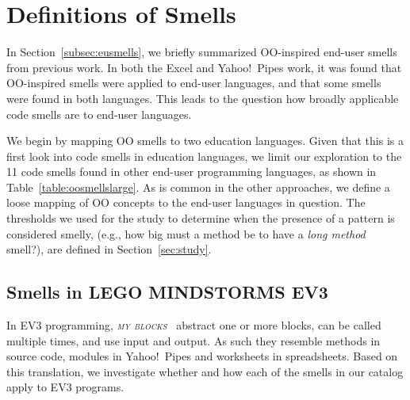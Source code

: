 \documentclass[conference]{IEEEtran}
\newcommand{\ms}{LEGO MINDSTORMS EV3}
\newcommand{\mbs}{\textsc{my blocks}}
\newcommand{\todo}[1]{\textbf{#1}}
\begin{document}


\section{Definitions of Smells}
\label{sec:definition}
In Section~\ref{subsec:eusmells}, we briefly summarized OO-inspired end-user smells from previous work. In both the Excel and Yahoo!\ Pipes work, it was found that OO-inspired smells were applied to end-user languages, and that some smells were found in both languages. This leads to the question how broadly applicable code smells are to end-user languages. 

We begin by mapping OO smells to two education languages. Given that this is a first look into code smells in education languages, we limit our exploration to the 11 code smells found in other end-user programming languages, as shown in Table~\ref{table:oosmellslarge}.
As is common in the other approaches, we define a loose mapping of OO concepts to the end-user languages in question.
The thresholds we used for the study to determine when the presence of a pattern is considered smelly, (e.g., how big must a method be to have a \emph{long method} smell?),  are defined in Section~\ref{sec:study}. 



\subsection{Smells in \ms}
In EV3 programming, \emph{\mbs~} abstract one or more  blocks, can be called multiple times, and use input and output. As such they resemble methods in source code, modules in Yahoo!\ Pipes and worksheets in spreadsheets. Based on this translation, we investigate whether and how each of the smells in our catalog  apply to EV3 programs.  
\end{document}
